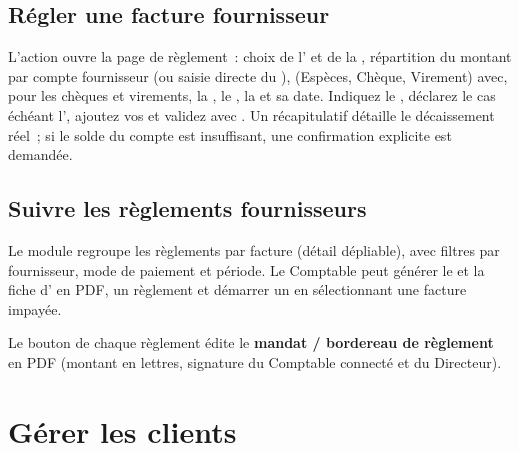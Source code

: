 

\subsection{Régler une facture fournisseur}

L'action  ouvre la page de règlement~: choix de l' et de la , répartition du montant par compte fournisseur (ou saisie directe du ),  (Espèces, Chèque, Virement) avec, pour les chèques et virements, la , le , la  et sa date. Indiquez le , déclarez le cas échéant l', ajoutez vos  et validez avec . Un récapitulatif détaille le décaissement réel~; si le solde du compte est insuffisant, une confirmation explicite est demandée.


\subsection{Suivre les règlements fournisseurs}

Le module  regroupe les règlements par facture (détail dépliable), avec filtres par fournisseur, mode de paiement et période. Le Comptable peut générer le  et la fiche d' en PDF,  un règlement et démarrer un  en sélectionnant une facture impayée.


Le bouton  de chaque règlement édite le \textbf{mandat / bordereau de règlement} en PDF (montant en lettres, signature du Comptable connecté et du Directeur).

\section{Gérer les clients}

